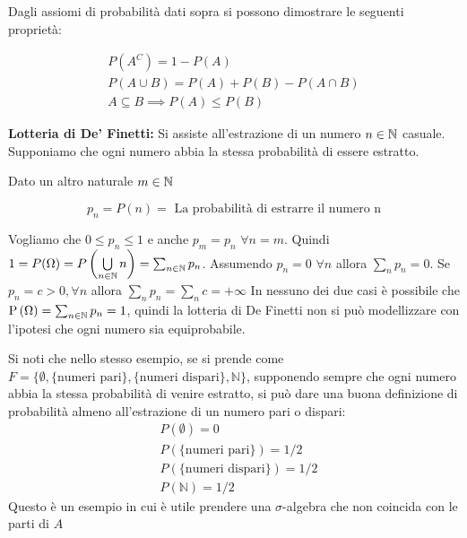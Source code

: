 	\begin{prop}
		Dagli assiomi di probabilit\`a dati sopra si possono dimostrare le seguenti propriet\`a:
		
		\begin{equation}
			\begin{aligned}
				P(A^C) = 1 - P(A) 	\\
				P(A \cup B) = P(A) + P(B) - P(A \cap B) \\
				A \subseteq B \implies P(A) \leq P(B)
			\end{aligned}
		\end{equation}
	\end{prop}


\begin{exmp}
	\textbf{Lotteria di De' Finetti:}
	Si assiste all'estrazione di un numero $ n \in \mathbb{N} $ casuale. Supponiamo che ogni numero abbia la stessa probabilit\`a di essere estratto.
	
	Dato un altro naturale $ m \in \mathbb{N} $
	
	\begin{equation*}
	p_n = P(n) = \text{ La probabilit\`a di estrarre il numero n}
	\end{equation*}
	
	Vogliamo che  $ 0 \leq p_n \leq 1 $ e anche $ p_m = p_n$ $\forall n = m $. Quindi $ 1 = P(\Omega) = P \left( \bigcup\limits_{n \in \mathbb{N}} n \right) = \sum_{n \in \mathbb{N}} p_n $. Assumendo $ p_n = 0$ $\forall n $ allora $ \sum_{n} p_n = 0 $. Se $ p_n = c > 0, \forall n $ allora $ \sum_{n} p_n = \sum_{n} c = + \infty $
	In nessuno dei due casi \`e possibile che $ \text{P}\left(\Omega\right) = \sum_{n \in \mathbb{N}} p_n = 1$, quindi la lotteria di De Finetti non si pu\`o modellizzare con l'ipotesi che ogni numero sia equiprobabile.

	Si noti che nello stesso esempio, se si prende come $F=\{\emptyset, \{\text{numeri pari}\},\{\text{numeri dispari}\},\mathbb{N}\}$, supponendo sempre che ogni numero abbia la stessa probabilit\`a di venire estratto, si pu\`o dare una buona definizione di probabilit\`a almeno all'estrazione di un numero pari o dispari:
	\begin{eqnarray*}
	&P(\emptyset)=0\\
	&P(\{\text{numeri pari}\})=1/2\\
	&P(\{\text{numeri dispari}\})=1/2\\
	&P(\mathbb{N})=1/2
	\end{eqnarray*}
Questo \`e un esempio in cui \`e utile prendere una $\sigma$-algebra che non coincida con le parti di $A$
\end{exmp}


